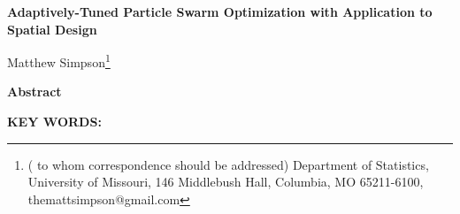 \documentclass[12pt]{article}
\begin{document}
\thispagestyle{empty} \baselineskip=28pt

\begin{center}
{\LARGE{\bf Adaptively-Tuned Particle Swarm Optimization with Application to Spatial Design}}
\end{center}

\baselineskip=12pt
\vskip 2mm
\blind
{
  \begin{center}
    Matthew Simpson\footnote{(\baselineskip=10pt to whom correspondence should be addressed)
      Department of Statistics, University of Missouri,
      146 Middlebush Hall, Columbia, MO 65211-6100, themattsimpson@gmail.com}
  \end{center}
} \fi

\vskip 2mm
\begin{center}
{\large{\bf Abstract}}
\end{center}
\baselineskip=12pt 

\baselineskip=12pt
\par\vfill\noindent
{\bf KEY WORDS:} 

\par\medskip\noindent


\clearpage\pagebreak\newpage {}
\baselineskip=24pt
\end{document}
